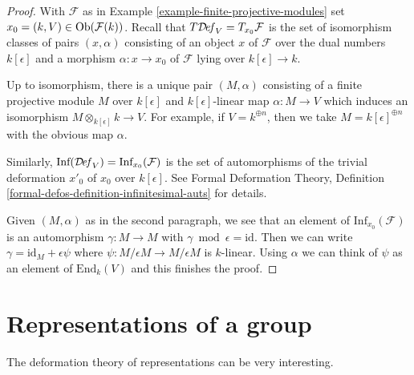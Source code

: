 \begin{proof}
With $\mathcal{F}$ as in Example \ref{example-finite-projective-modules}
set $x_0 = (k, V) \in \mathop{\mathrm{Ob}}\nolimits(\mathcal{F}(k))$.
Recall that $T\mathcal{D}\!\mathit{ef}_V = T_{x_0}\mathcal{F}$
is the set of isomorphism
classes of pairs $(x, \alpha)$ consisting of an object $x$ of $\mathcal{F}
$ over the dual numbers $k[\epsilon]$ and a morphism
$\alpha : x \to x_0$ of $\mathcal{F}$ lying over $k[\epsilon] \to k$.

\medskip\noindent
Up to isomorphism, there is a unique pair $(M, \alpha)$ consisting of a
finite projective module $M$ over $k[\epsilon]$
and $k[\epsilon]$-linear map $\alpha : M \to V$
which induces an isomorphism $M \otimes_{k[\epsilon]} k \to V$.
For example, if $V = k^{\oplus n}$, then we take
$M = k[\epsilon]^{\oplus n}$ with the obvious map $\alpha$.

\medskip\noindent
Similarly, $\text{Inf}(\mathcal{D}\!\mathit{ef}_V) = \text{Inf}_{x_0}(\mathcal{F})$
is the set of automorphisms
of the trivial deformation $x'_0$ of $x_0$ over $k[\epsilon]$.
See Formal Deformation Theory, Definition
\ref{formal-defos-definition-infinitesimal-auts} for details.

\medskip\noindent
Given $(M, \alpha)$ as in the second paragraph, we see that an element of
$\text{Inf}_{x_0}(\mathcal{F})$ is an automorphism $\gamma : M \to M$ with
$\gamma \bmod \epsilon = \text{id}$. Then we can write
$\gamma = \text{id}_M + \epsilon \psi$ where
$\psi : M/\epsilon M \to M/\epsilon M$ is $k$-linear.
Using $\alpha$ we can think of $\psi$ as an element of
$\text{End}_k(V)$ and this finishes the proof.
\end{proof}


\section{Representations of a group}
\label{section-representations}

\noindent
The deformation theory of representations can be very interesting.

